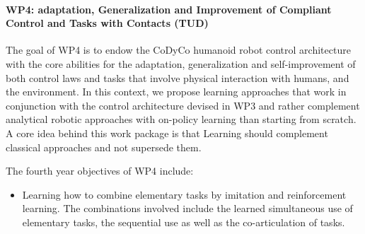 \paragraph{WP4: adaptation, Generalization and Improvement of Compliant Control and Tasks with Contacts (TUD)}

The goal of WP4 is to endow the CoDyCo humanoid robot control architecture with the core abilities for the
adaptation, generalization and self-improvement of both control laws and tasks that involve physical interaction
with humans, and the environment. In this context, we propose learning approaches that work in conjunction
with the control architecture devised in WP3 and rather complement analytical robotic approaches with on-policy
learning than starting from scratch. A core idea behind this work package is that Learning should complement
classical approaches and not supersede them.

The fourth year objectives of WP4 include:
\begin{itemize}
\item Learning how to combine elementary tasks by imitation and reinforcement learning. The combinations involved
include the learned simultaneous use of elementary tasks, the sequential use as well as the co-articulation of
tasks.
\end{itemize}
